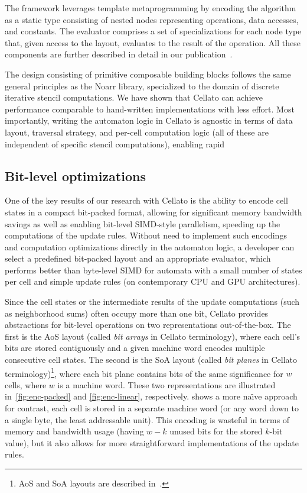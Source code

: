 The framework leverages \cpp template metaprogramming by encoding the algorithm as a static type consisting of nested nodes representing operations, data accesses, and constants. The evaluator comprises a set of specializations for each node type that, given access to the layout, evaluates to the result of the operation. All these components are further described in detail in our publication~\cite{brabec2025cellato}.

The design consisting of primitive composable building blocks follows the same general principles as the Noarr library, specialized to the domain of discrete iterative stencil computations. We have shown that Cellato can achieve performance comparable to hand-written implementations with less effort. Most importantly, writing the automaton logic in Cellato is agnostic in terms of data layout, traversal strategy, and per-cell computation logic (all of these are independent of specific stencil computations), enabling rapid


\subsection{Bit-level optimizations}\label{sec:cellato-bit-optimizations}

One of the key results of our research with Cellato is the ability to encode cell states in a compact bit-packed format, allowing for significant memory bandwidth savings as well as enabling bit-level SIMD-style parallelism, speeding up the computations of the update rules. Without need to implement such encodings and computation optimizations directly in the automaton logic, a developer can select a predefined bit-packed layout and an appropriate evaluator, which performs better than byte-level SIMD for automata with a small number of states per cell and simple update rules (on contemporary CPU and GPU architectures).

Since the cell states or the intermediate results of the update computations (such as neighborhood sums) often occupy more than one bit, Cellato provides abstractions for bit-level operations on two representations out-of-the-box. The first is the AoS layout (called \emph{bit arrays} in Cellato terminology), where each cell's bits are stored contiguously and a given machine word encodes multiple consecutive cell states. The second is the SoA layout (called \emph{bit planes} in Cellato terminology)\footnote{AoS and SoA layouts are described in~.}, where each bit plane contains bits of the same significance for $w$ cells, where $w$ is a machine word. These two representations are illustrated in~\cref{fig:enc-packed} and \cref{fig:enc-linear}, respectively.  shows a more na\"{\i}ve approach for contrast, each cell is stored in a separate machine word (or any word down to a single byte, the least addressable unit). This encoding is wasteful in terms of memory and bandwidth usage (having $w - k$ unused bits for the stored $k$-bit value), but it also allows for more straightforward implementations of the update rules.

